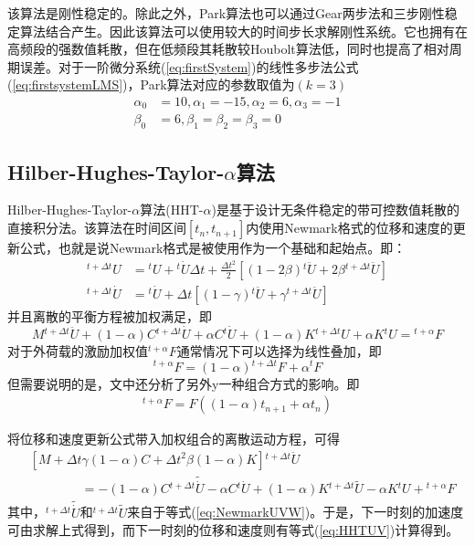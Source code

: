 该算法是刚性稳定的。除此之外，Park算法也可以通过Gear两步法\cite{Gear1971a}和三步刚性稳定算法\cite{Gear1971a}结合产生。因此该算法可以使用较大的时间步长求解刚性系统。它也拥有在高频段的强数值耗散，但在低频段其耗散较Houbolt算法低，同时也提高了相对周期误差。对于一阶微分系统(\ref{eq:firstSystem})的线性多步法公式(\ref{eq:firstsystemLMS})，Park算法对应的参数取值为$(k=3)$
\begin{equation}
\begin{split}
\alpha_0&=10,\alpha_1=-15,\alpha_2=6,\alpha_3=-1\\
\beta_0&=6,\beta_1=\beta_2=\beta_3=0
\end{split}
\end{equation}

\subsection{Hilber-Hughes-Taylor-$\alpha$算法}
Hilber-Hughes-Taylor-$\alpha$算法(HHT-$\alpha$)\cite{Hilber1977}是基于设计无条件稳定的带可控数值耗散的直接积分法。该算法在时间区间$[t_n,t_{n+1}]$内使用Newmark格式的位移和速度的更新公式，也就是说Newmark格式是被使用作为一个基础和起始点。即：
\begin{subequations}
\begin{align}
{^{t+\Delta t}\!{U}}&={^t\!U}+{^t\!\dot{U}}\Delta t+\frac{\Delta t^2}{2}[(1-2\beta){^t\!\ddot{U}}+2\beta{^{t+\Delta t}\!\ddot{U}}]\\
{^{t+\Delta t}\!\dot{U}}&={^t\!\dot{U}}+\Delta t[(1-\gamma){^t\!\ddot{U}}+\gamma{^{t+\Delta t}\!\ddot{U}}]
\end{align}\label{eq:HHTUV}
\end{subequations}
并且离散的平衡方程被加权满足，即
\begin{equation}
M{^{t+\Delta t}\!\ddot{U}}+(1-\alpha)C{^{t+\Delta t}\!\dot{U}}+\alpha C{^{t}\!\dot{U}}+(1-\alpha)K{^{t+\Delta t}\!U}+\alpha K{^t\!U}={^{t+\alpha}\!F}
\end{equation}
对于外荷载的激励加权值${^{t+\alpha}\!F}$通常情况下可以选择为线性叠加，即
\begin{equation}
{^{t+\alpha}\!F}=(1-\alpha){^{t+\Delta t}\!F}+\alpha{^t\!F}
\end{equation}
但需要说明的是，文中还分析了另外y一种组合方式的影响。即
\begin{align}
{^{t+\alpha}\!F}=F((1-\alpha)t_{n+1}+\alpha t_n)
\end{align}

将位移和速度更新公式带入加权组合的离散运动方程，可得
\begin{equation}
\begin{split}
&\left[M+\Delta t\gamma(1-\alpha)C+\Delta t^2\beta(1-\alpha)K\right]{^{t+\Delta t}\!\ddot{U}}\\
&\qquad\qquad=-(1-\alpha)C{^{t+\Delta t}\!\widetilde{\dot{U}}}-\alpha C{^t\!\dot{U}}+(1-\alpha)K{^{t+\Delta t}\!\widetilde{U}}-\alpha K{^t\!U}+{^{t+\alpha}\!F}
\end{split}
\end{equation}
其中，${^{t+\Delta t}\!\widetilde{\dot{U}}}$和${^{t+\Delta t}\!\widetilde{U}}$来自于等式(\ref{eq:NewmarkUVW})。于是，下一时刻的加速度可由求解上式得到，而下一时刻的位移和速度则有等式(\ref{eq:HHTUV})计算得到。

